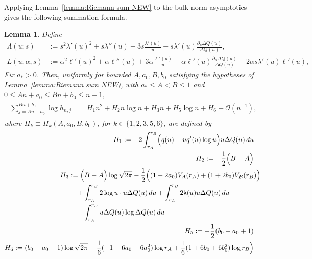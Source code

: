 \documentclass[a4paper]{article}
\newtheorem{lemma}[theorem]{Lemma}
\numberwithin{equation}{section}
\begin{document}
Applying Lemma~\ref{lemma:Riemann sum NEW} to the bulk norm asymptotics gives the following summation formula.
\begin{lemma}\label{lemma:general sum}
Define
\begin{align}
\label{def of Lammda us}
\Lambda(u;s)&:=s^2\lambda'(u)^2+s\lambda''(u)+3s\frac{\lambda'(u)}{u}-s\lambda'(u)\frac{\partial_u\Delta Q(u)}{\Delta Q(u)},\\
\label{def of L us}
L(u;\alpha,s)&:=\alpha^2\ell'(u)^2+\alpha \ell''(u)+3\alpha\frac{\ell'(u)}{u}-\alpha \ell'(u)\frac{\partial_u\Delta Q(u)}{\Delta Q(u)}+2\alpha s\lambda'(u)\ell'(u),
\end{align}
Fix $a_*>0$.  Then, uniformly for bounded $A,a_0,B,b_0$ satisfying the
hypotheses of Lemma~\ref{lemma:Riemann sum NEW}, with $a_*\leq A<B\leq1$
and $0\leq An+a_0\leq Bn+b_0\leq n-1$,
\begin{align}
\begin{split}
\sum_{j=An+a_0}^{Bn+b_0}\log h_{n,j} 
&=
H_{1}n^2+H_2n\log n+H_3n+H_5\log n+H_6+\mathcal{O}(n^{-1}),
\end{split}    
\end{align}
where $H_k\equiv H_k(A,a_0,B,b_0)$, for $k\in\{1,2,3,5,6\}$, are defined by
\begin{align}
\begin{split}
H_1&:=    
-
2\int_{r_{A}}^{r_{B}}\Bigl( 
q(u)-uq'(u)\log u
\Bigr)u\Delta Q(u)\,du
\end{split} 
\\
\begin{split}
H_2&:=
-\frac{1}{2}\Bigl(B-A\Bigr)
\end{split}
\\
\begin{split}
H_3&:=    
\Bigl(B-A\Bigr)\log\sqrt{2\pi}
-\frac{1}{2}\Bigl((1-2a_0)V_{A}(r_{A})+(1+2b_0)V_{B}(r_{B})\Bigr)
\\
&\quad
+\int_{r_{A}}^{r_{B}}2\log u\cdot u\Delta Q(u)\,du
+\int_{r_{A}}^{r_{B}}2\mathsf{k}(u)u\Delta Q(u)\,du
\\
&\quad
-\int_{r_{A}}^{r_{B}}u\Delta Q(u)\log \Delta Q(u)\,du
\end{split} 
\\
\begin{split}
H_5&:=    
-\frac{1}{2}(b_0-a_0+1)
\end{split} 
\\
\begin{split}
H_6&:=   
(b_0-a_0+1)\log\sqrt{2\pi}
+\frac{1}{6}(-1+6a_0-6a_0^2)\log r_{A}
+\frac{1}{6}(1+6b_0+6b_0^2)
\log r_{B}\Bigr)

\end{split}
\end{align}
\end{lemma}
\end{document}
